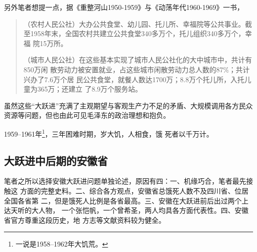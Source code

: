 另外笔者想提一点，据《重整河山1950-1959》与《动荡年代1960-1969》一书，
\begin{quotation}
  （农村人民公社）大办公共食堂、幼儿园、托儿所、幸福院等公共事业。截
  至1958年末，全国农村共建立公共食堂340多万个，托儿组织340多万个，幸福
  院15万所。

  （城市人民公社）在这些基本实现了城市人民公社化的大中城市中，共计有850万闲
  散劳动力被安置就业，占这些城市闲散劳动力总人数的87\%；共计兴办了7.6万个居
  民公共食堂，就餐人数达1700万；8.8万个托儿所，入托儿童为365万；还建立
  了8.9万个服务站。
\end{quotation}
虽然这些“大跃进”充满了主观期望与客观生产力不足的矛盾、大规模调用各方民众
资源等问题，但也由此可见毛泽东的政治理想和抱负。

1959--1961年\footnote{一说是1958--1962年大饥荒。}，三年困难时期，岁大饥，人相食，饿
死者以千万计。

\subsection{大跃进中后期的安徽省}

笔者之所以选择安徽大跃进问题单独论述，原因有四：一、机缘巧合，笔者最先接触这
方面的完整史料。二、综合各方观点，安徽省总饿死人数不及四川省、位居全国各省第
二，但是饿死人比例是各省最高。三、安徽在大跃进前后出过两个上达天听的大人物，
一个张恺帆，一个曾希圣，两人均具各方面代表性。四、安徽省官方尊重这段历史，地
方志等文献资料较为健全。

